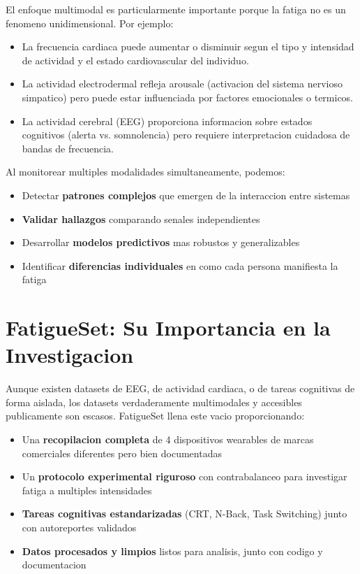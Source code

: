 El enfoque multimodal es particularmente importante porque la fatiga no es un
fenomeno unidimensional. Por ejemplo:

\begin{itemize}
    \item La frecuencia cardiaca puede aumentar o disminuir segun el tipo y
          intensidad de actividad y el estado cardiovascular del individuo.
    \item La actividad electrodermal refleja arousale (activacion del sistema nervioso
          simpatico) pero puede estar influenciada por factores emocionales o
          termicos.
    \item La actividad cerebral (EEG) proporciona informacion sobre estados cognitivos
          (alerta vs. somnolencia) pero requiere interpretacion cuidadosa de bandas
          de frecuencia.
\end{itemize}

Al monitorear multiples modalidades simultaneamente, podemos:
\begin{itemize}
    \item Detectar \textbf{patrones complejos} que emergen de la interaccion entre sistemas
    \item \textbf{Validar hallazgos} comparando senales independientes
    \item Desarrollar \textbf{modelos predictivos} mas robustos y generalizables
    \item Identificar \textbf{diferencias individuales} en como cada persona manifiesta la fatiga
\end{itemize}

\section{FatigueSet: Su Importancia en la Investigacion}

Aunque existen datasets de EEG, de actividad cardiaca, o de tareas cognitivas de
forma aislada, los datasets verdaderamente multimodales y accesibles publicamente
son escasos. FatigueSet llena este vacio proporcionando:

\begin{itemize}
    \item Una \textbf{recopilacion completa} de 4 dispositivos wearables de marcas
          comerciales diferentes pero bien documentadas
    \item Un \textbf{protocolo experimental riguroso} con contrabalanceo para
          investigar fatiga a multiples intensidades
    \item \textbf{Tareas cognitivas estandarizadas} (CRT, N-Back, Task Switching)
          junto con autoreportes validados
    \item \textbf{Datos procesados y limpios} listos para analisis, junto con codigo
          y documentacion
\end{itemize}

